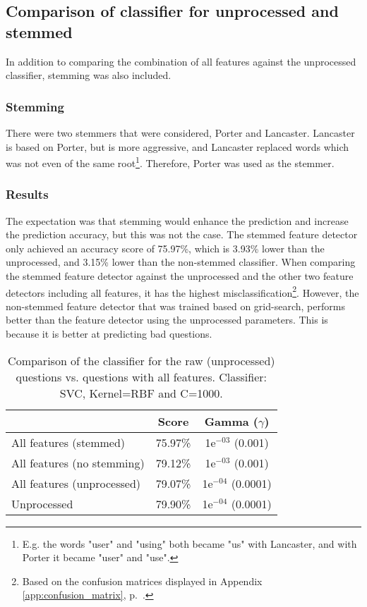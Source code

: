 \subsection{Comparison of classifier for unprocessed and stemmed}
\label{sec:comparing_unprocessed_all_features}
In addition to comparing the combination of all features against the unprocessed classifier, stemming was also included. 

\subsubsection{Stemming}
\label{stemming}
There were two stemmers that were considered, Porter and Lancaster.
Lancaster is based on Porter, but is more aggressive, and Lancaster replaced words which was not even of the same root\footnote{
	E.g. the words "user" and "using" both became "us" with Lancaster, and with Porter it became "user" and "use".
}.
Therefore, Porter was used as the stemmer.

\subsubsection{Results}
The expectation was that stemming would enhance the prediction and increase the prediction accuracy, but this was not the case. 
The stemmed feature detector only achieved an accuracy score of 75.97\%, which is 3.93\% lower than the unprocessed, and 3.15\% lower than the non-stemmed classifier.
When comparing the stemmed feature detector against the unprocessed and the other two feature detectors including all features, it has the highest misclassification\footnote{ 
	Based on the confusion matrices displayed in Appendix \ref{app:confusion_matrix}, p.~\pageref{app:confusion_matrix}.
}.
However, the non-stemmed feature detector that was trained based on grid-search, performs better than the feature detector using the unprocessed parameters.
This is because it is better at predicting bad questions.


\begin{table}[!h]%
	\centering
	\begin{tabular}{| l | c | c |}
		\hline
		~ 							& Score		& Gamma ($\gamma$)		\\ \hline
		All features (stemmed)		& 75.97\%	& 1e$^{-03}$ (0.001)	\\ \hline
		All features (no stemming)	& 79.12\%	& 1e$^{-03}$ (0.001)	\\ \hline
		All features (unprocessed)	& 79.07\%	& 1e$^{-04}$ (0.0001)	\\ \hline
		Unprocessed					& 79.90\%	& 1e$^{-04}$ (0.0001)	\\ \hline
	\end{tabular}
	\caption{Comparison of the classifier for the raw (unprocessed) questions vs. questions with all features. Classifier: SVC, Kernel=RBF and C=1000.}
	\label{tab:unprocessed_vs_all_feature_detectors_svc_so}
\end{table}


